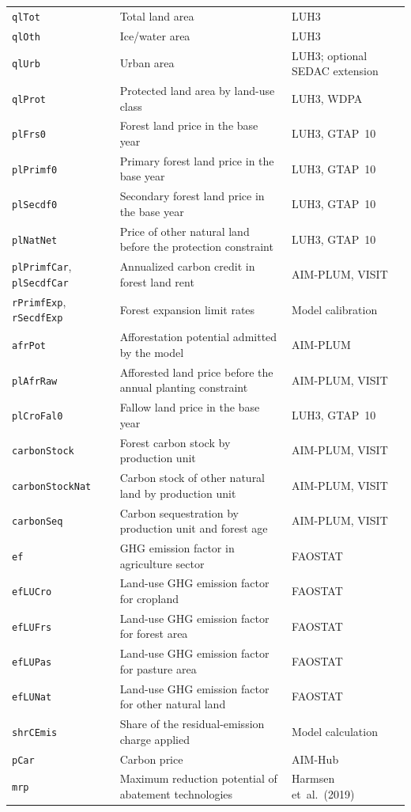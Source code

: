 \begin{xltabular}{\linewidth}{l X l}
  \texttt{qlTot} & Total land area & LUH3 \\
  \texttt{qlOth} & Ice/water area & LUH3 \\
  \texttt{qlUrb} & Urban area & LUH3; optional SEDAC extension \\
  \texttt{qlProt} & Protected land area by land-use class & LUH3, WDPA \\
  \texttt{plFrs0} & Forest land price in the base year & LUH3, GTAP~10 \\
  \texttt{plPrimf0} & Primary forest land price in the base year & LUH3, GTAP~10 \\
  \texttt{plSecdf0} & Secondary forest land price in the base year & LUH3, GTAP~10 \\
  \texttt{plNatNet} & Price of other natural land before the protection constraint & LUH3, GTAP~10 \\
  \texttt{plPrimfCar}, \texttt{plSecdfCar} & Annualized carbon credit in forest land rent & AIM-PLUM, VISIT \\
  \texttt{rPrimfExp}, \texttt{rSecdfExp} & Forest expansion limit rates & Model calibration \\
  \texttt{afrPot} & Afforestation potential admitted by the model & AIM-PLUM \\
  \texttt{plAfrRaw} & Afforested land price before the annual planting constraint & AIM-PLUM, VISIT \\
  \texttt{plCroFal0} & Fallow land price in the base year & LUH3, GTAP~10 \\
  \texttt{carbonStock} & Forest carbon stock by production unit & AIM-PLUM, VISIT \\
  \texttt{carbonStockNat} & Carbon stock of other natural land by production unit & AIM-PLUM, VISIT \\
  \texttt{carbonSeq} & Carbon sequestration by production unit and forest age & AIM-PLUM, VISIT \\
  \texttt{ef} & GHG emission factor in agriculture sector & FAOSTAT \\
  \texttt{efLUCro} & Land-use GHG emission factor for cropland & FAOSTAT \\
  \texttt{efLUFrs} & Land-use GHG emission factor for forest area & FAOSTAT \\
  \texttt{efLUPas} & Land-use GHG emission factor for pasture area & FAOSTAT \\
  \texttt{efLUNat} & Land-use GHG emission factor for other natural land & FAOSTAT \\
  \texttt{shrCEmis} & Share of the residual-emission charge applied & Model calculation \\
  \texttt{pCar} & Carbon price & AIM-Hub \\
  \texttt{mrp} & Maximum reduction potential of abatement technologies & Harmsen et~al.~(2019) \\
\end{xltabular}




